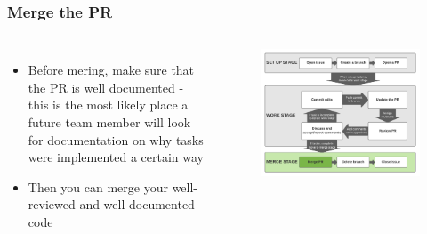 \documentclass[aspectratio=169]{beamer} %
\begin{document}
\begin{frame}
	\frametitle{Merge the PR}
	\begin{columns}[c]
		
		\begin{itemize}
			\setlength\itemsep{1em}
			\item Before mering, make sure that the PR is well documented - this is the most likely place a future team member will look for documentation on why tasks were implemented a certain way 
			\item Then you can merge your well-reviewed and well-documented code
			
		\end{itemize}
		
		\vspace{-.75cm}
		\begin{figure}
			\centering
			\includegraphics[width=\textwidth]{./img/branch-pr-merge-cycle-S3-1.png}
		\end{figure}
		
	\end{columns}
\end{frame}
\end{document}
